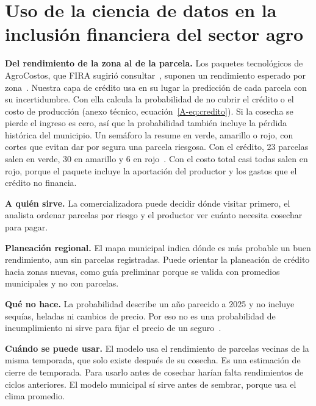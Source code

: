 \section{Uso de la ciencia de datos en la inclusión financiera del sector agro}\label{sec:inclusion}

\textbf{Del rendimiento de la zona al de la parcela.} Los paquetes tecnológicos de AgroCostos, que FIRA sugirió consultar~\cite{preguntas},
suponen un rendimiento esperado por zona~\cite{agrocostos}. Nuestra
capa de crédito usa en su lugar la predicción de cada parcela con su incertidumbre. Con ella calcula la probabilidad de
no cubrir el crédito o el costo de producción (anexo técnico, ecuación~\ref{A-eq:credito}). Si la cosecha se pierde el
ingreso es cero, así que la probabilidad también incluye la pérdida histórica del municipio. Un semáforo la resume en
verde, amarillo o rojo, con cortes que evitan dar por segura una parcela riesgosa. Con el crédito, 23 parcelas salen en verde, 30 en amarillo y 6 en rojo~\cite{repo}. Con el costo total casi
todas salen en rojo, porque el paquete incluye la aportación del productor y los gastos que el crédito no financia.

\textbf{A quién sirve.} La comercializadora puede decidir dónde visitar primero, el analista ordenar parcelas por riesgo
y el productor ver cuánto necesita cosechar para pagar.

\textbf{Planeación regional.} El mapa municipal indica dónde es más probable un buen rendimiento, aun sin parcelas
registradas. Puede orientar la planeación de crédito hacia zonas nuevas, como guía preliminar porque se valida con promedios
municipales y no con parcelas.

\textbf{Qué no hace.} La probabilidad describe un año parecido a 2025 y no incluye sequías, heladas ni cambios de precio.
Por eso no es una probabilidad de incumplimiento ni sirve para fijar el precio de un seguro~\cite{jensen2017}.

\textbf{Cuándo se puede usar.} El modelo usa el rendimiento de parcelas vecinas de la misma temporada, que solo existe
después de su cosecha. Es una estimación de cierre de temporada. Para usarlo antes de cosechar harían falta rendimientos
de ciclos anteriores. El modelo municipal sí sirve antes de sembrar, porque usa el clima promedio.
